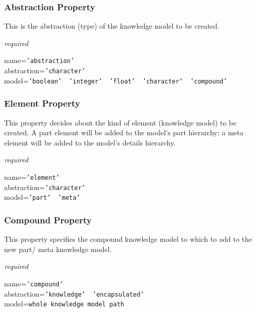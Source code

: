 \subsubsection{Abstraction Property}

This is the abstraction (type) of the knowledge model to be created.

\emph{required}

name=\texttt{'abstraction'}\\
abstraction=\texttt{'character'}\\
model=\texttt{'boolean' \vline\ 'integer' \vline\ 'float' \vline\ 'character' \vline\ 'compound'}

\subsubsection{Element Property}

This property decides about the kind of element (knowledge model) to be created.
A part element will be added to the model's part hierarchy;
a meta element will be added to the model's details hierarchy.

\emph{required}

name=\texttt{'element'}\\
abstraction=\texttt{'character'}\\
model=\texttt{'part' \vline\ 'meta'}

\subsubsection{Compound Property}

This property specifies the compound knowledge model to which to add to the new
part/ meta knowledge model.

\emph{required}

name=\texttt{'compound'}\\
abstraction=\texttt{'knowledge' \vline\ 'encapsulated'}\\
model=\texttt{whole knowledge model path}
